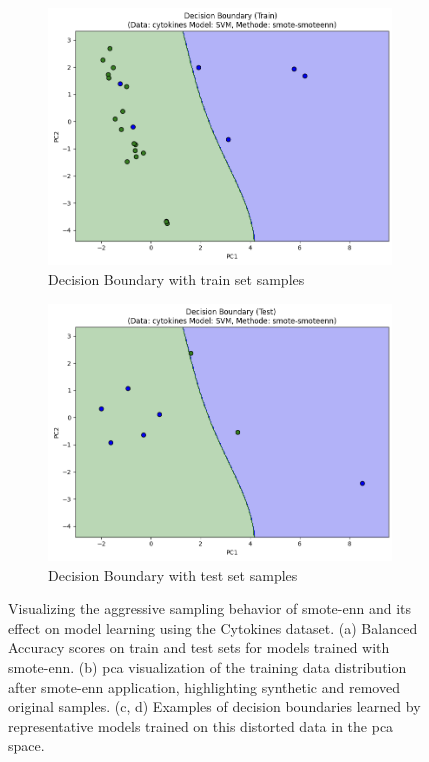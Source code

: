 \documentclass[12pt,a4paper]{report}
\begin{document}
\begin{figure}[h!]
    \begin{subfigure}[b]{0.48\textwidth}
        \centering
        \includegraphics[width=\textwidth]{images/smote_een_fig1c.png}
        \caption{Decision Boundary with train set samples}
        \label{fig:smote_enn_fig1c}
    \end{subfigure}
    \hfill
    \begin{subfigure}[b]{0.48\textwidth}
        \centering
        \includegraphics[width=\textwidth]{images/smote_een_fig1d.png}
        \caption{Decision Boundary with test set samples} 
        \label{fig:smote_enn_fig1d}
    \end{subfigure}

    \caption[Visualizing \gls{smote}-\gls{enn} on Cytokines]{Visualizing the aggressive sampling behavior of \gls{smote}-\gls{enn} and its effect on model learning using the Cytokines dataset. (a) Balanced Accuracy scores on train and test sets for models trained with \gls{smote}-\gls{enn}. (b) \gls{pca} visualization of the training data distribution after \gls{smote}-\gls{enn} application, highlighting synthetic and removed original samples. (c, d) Examples of decision boundaries learned by representative models trained on this distorted data in the \gls{pca} space.}
    \label{fig:smote-enn-example-1} 
\end{figure}
\end{document}

